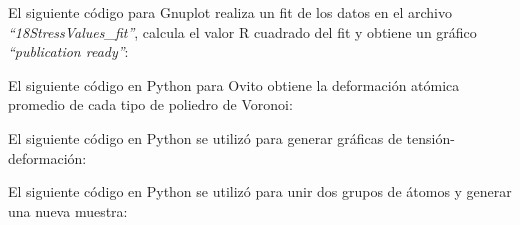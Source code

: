 El siguiente código para Gnuplot realiza un fit de los datos en el archivo \textit{``18StressValues\_fit''}, calcula el valor R cuadrado del fit y obtiene un gráfico \textit{``publication ready''}:



El siguiente código en Python para Ovito obtiene la deformación atómica promedio de cada tipo de poliedro de Voronoi:



El siguiente código en Python se utilizó para generar gráficas de tensión-deformación:



El siguiente código en Python se utilizó para unir dos grupos de átomos y generar una nueva muestra:

